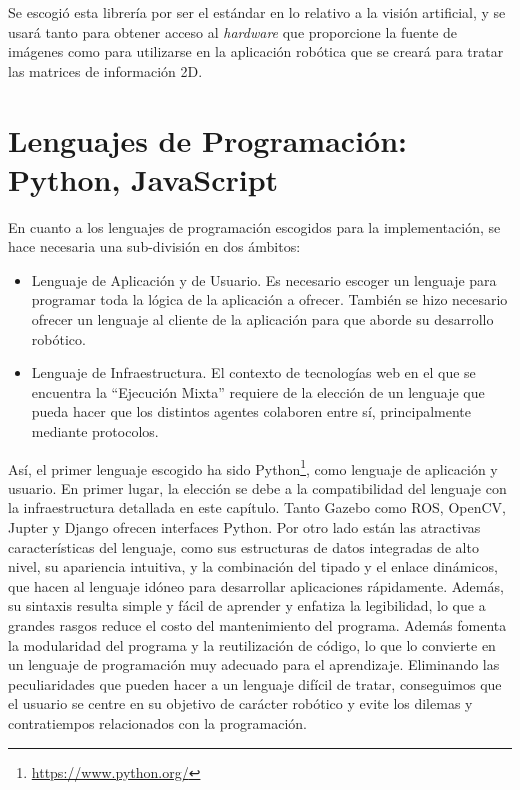 Se escogió esta librería por ser el estándar en lo relativo a la visión artificial, y se usará tanto para obtener acceso al \textit{hardware} que proporcione la fuente de imágenes como para utilizarse en la aplicación robótica que se creará para tratar las matrices de información 2D.

\section{Lenguajes de Programación: Python, JavaScript}

En cuanto a los lenguajes de programación escogidos para la implementación, se hace necesaria una sub-división en dos ámbitos:

\begin{itemize}
    \item Lenguaje de Aplicación y de Usuario. Es necesario escoger un lenguaje para programar toda la lógica de la aplicación a ofrecer. También se hizo necesario ofrecer un lenguaje al cliente de la aplicación para que aborde su desarrollo robótico.
    \item Lenguaje de Infraestructura. El contexto de tecnologías web en el que se encuentra la ``Ejecución Mixta'' requiere de la elección de un lenguaje que pueda hacer que los distintos agentes colaboren entre sí, principalmente mediante protocolos.
\end{itemize}

Así, el primer lenguaje escogido ha sido Python\footnote{\url{https://www.python.org/}}, como lenguaje de aplicación y usuario. En primer lugar, la elección se debe a la compatibilidad del lenguaje con la infraestructura detallada en este capítulo. Tanto Gazebo como ROS, OpenCV, Jupter y Django ofrecen interfaces Python. Por otro lado están las atractivas características del lenguaje, como sus estructuras de datos integradas de alto nivel, su apariencia intuitiva, y la combinación del tipado y el enlace dinámicos, que hacen al lenguaje idóneo para desarrollar aplicaciones rápidamente. Además, su sintaxis resulta simple y fácil de aprender y enfatiza la legibilidad, lo que a grandes rasgos reduce el costo del mantenimiento del programa. Además fomenta la modularidad del programa y la reutilización de código, lo que lo convierte en un lenguaje de programación muy adecuado para el aprendizaje. Eliminando las peculiaridades que pueden hacer a un lenguaje difícil de tratar, conseguimos que el usuario se centre en su objetivo de carácter robótico y evite los dilemas y contratiempos relacionados con la programación.

